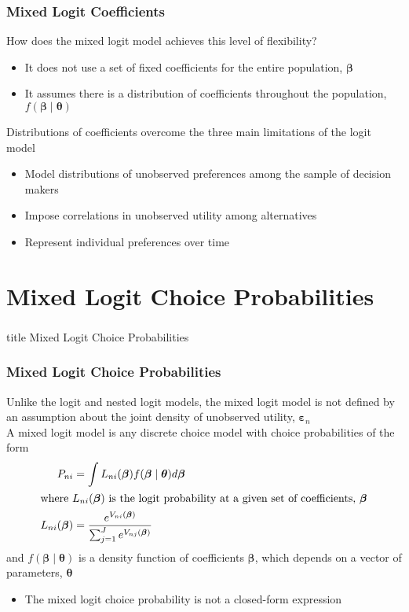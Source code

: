 \documentclass{beamer}\usepackage[]{graphicx}\usepackage[]{color}
\begin{document}
\begin{frame}\frametitle{Mixed Logit Coefficients}
    How does the mixed logit model achieves this level of flexibility?
    \begin{itemize}
        \item It does not use a set of fixed coefficients for the entire population, $\bm{\beta}$
        \item It assumes there is a distribution of coefficients throughout the population, $f(\bm{\beta} \mid \bm{\theta})$
    \end{itemize}
    \vspace{3ex}
    Distributions of coefficients overcome the three main limitations of the logit model
    \begin{itemize}
        \item Model distributions of unobserved preferences among the sample of decision makers
        \item Impose correlations in unobserved utility among alternatives
        \item Represent individual preferences over time
    \end{itemize}
\end{frame}

\section{Mixed Logit Choice Probabilities}
\label{prob}
\begin{frame}\frametitle{}
    \vfill
    \centering
    \begin{beamercolorbox}[center]{title}
        \Large Mixed Logit Choice Probabilities
    \end{beamercolorbox}
    \vfill
\end{frame}

\begin{frame}\frametitle{Mixed Logit Choice Probabilities}
	Unlike the logit and nested logit models, the mixed logit model is not defined by an assumption about the joint density of unobserved utility, $\bm{\varepsilon}_n$ \\
	\vspace{3ex}
    A mixed logit model is any discrete choice model with choice probabilities of the form
    \begin{align*}
        P_{ni} & = \int L_{ni}(\bm{\beta}) f(\bm{\beta} \mid \bm{\theta}) d \bm{\beta} \\
        \intertext{where $L_{ni}(\bm{\beta})$ is the logit probability at a given set of coefficients, $\bm{\beta}$}
        L_{ni}(\bm{\beta}) & = \frac{e^{V_{ni}(\bm{\beta})}}{\sum_{j = 1}^J e^{V_{nj}(\bm{\beta})}}
    \end{align*}
    and $f(\bm{\beta} \mid \bm{\theta})$ is a density function of coefficients $\bm{\beta}$, which depends on a vector of parameters, $\bm{\theta}$
    \begin{itemize}
    	\item The mixed logit choice probability is not a closed-form expression
    \end{itemize}
\end{frame}
\end{document}
